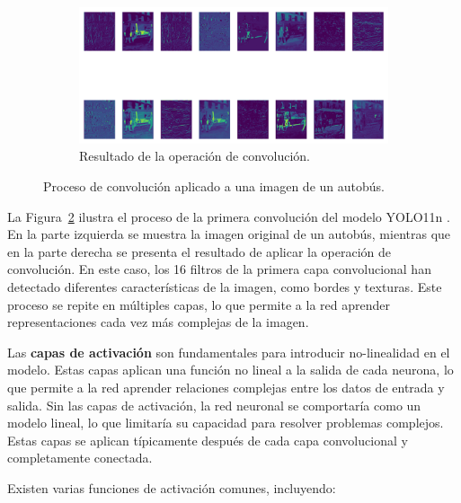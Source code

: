 \documentclass[11pt,spanish,listoffigures,listoftables]{tfgetsinf}
\begin{document}
\begin{figure}[H]
\begin{subfigure}[b]{0.7\textwidth}
      \centering
      \includegraphics[width=\textwidth]{images/estado_del_arte/bus_primera_capa_convolucion.png}
      \caption[Resultado de la operación de convolución]{Resultado de la operación de convolución.}
      \label{fig:bus_primera_capa_convolucion}
   \end{subfigure}
   \caption[Proceso de convolución aplicado a una imagen de un autobús]{Proceso de convolución aplicado a una imagen de un autobús.}
   \label{fig:bus_convolucion}
\end{figure}

La Figura~\ref{fig:bus_convolucion} ilustra el proceso de la primera convolución del modelo YOLO11n \cite{yolo11_ultralytics}. En la parte izquierda se muestra la imagen original de un autobús, mientras que en la parte derecha se presenta el resultado de aplicar la operación de convolución. En este caso, los 16 filtros de la primera capa convolucional han detectado diferentes características de la imagen, como bordes y texturas. Este proceso se repite en múltiples capas, lo que permite a la red aprender representaciones cada vez más complejas de la imagen.

Las \textbf{capas de activación} son fundamentales para introducir no-linealidad en el modelo. Estas capas aplican una función no lineal a la salida de cada neurona, lo que permite a la red aprender relaciones complejas entre los datos de entrada y salida. Sin las capas de activación, la red neuronal se comportaría como un modelo lineal, lo que limitaría su capacidad para resolver problemas complejos. Estas capas se aplican típicamente después de cada capa convolucional y completamente conectada.

Existen varias funciones de activación comunes, incluyendo:
\end{document}
